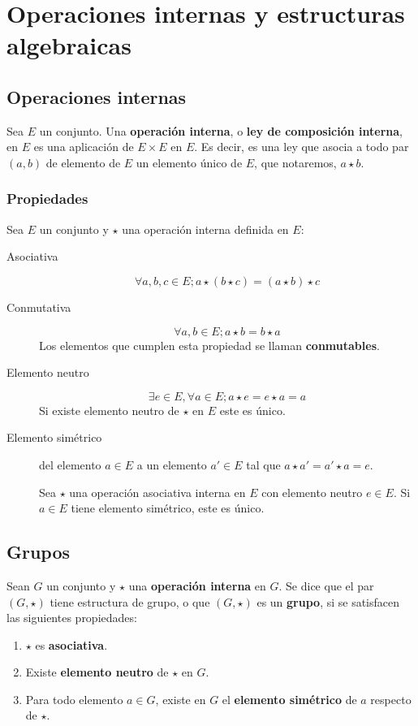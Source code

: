 \chapter{Operaciones internas y estructuras algebraicas}

\section{Operaciones internas}

Sea $E$ un conjunto. Una \textbf{operación interna}, o \textbf{ley de composición interna}, en $E$ es una aplicación de $E \times E$ en $E$. Es decir, es una ley que asocia a todo par $(a,b)$ de elemento de $E$ un elemento único de $E$, que notaremos, $a \star b$.

\subsection{Propiedades}

Sea $E$ un conjunto y $\star$ una operación interna definida en $E$:

\begin{description}
\item[Asociativa]
\[
\forall a,b,c \in E; a \star (b \star c) = (a \star b) \star c
\]
\item[Conmutativa] 
\[
\forall a,b \in E; a \star b = b \star a
\]
Los elementos que cumplen esta propiedad se llaman \textbf{conmutables}.
\item[Elemento neutro] 
\[
\exists e \in E,\forall a \in E; a \star e = e \star a = a
\]
Si existe elemento neutro de $\star$ en $E$ este es único.
\item[Elemento simétrico] del elemento $a \in E$ a un elemento $a' \in E$ tal que $a \star a' = a' \star a = e$.

Sea $\star$ una operación asociativa interna en $E$ con elemento neutro $e \in E$. Si $a \in E$ tiene elemento simétrico, este es único.
\end{description}

\section{Grupos}

Sean $G$ un conjunto y $\star$ una \textbf{operación interna} en $G$. Se dice que el par $(G,\star)$ tiene estructura de grupo, o que $(G,\star)$ es un \textbf{grupo}, si se satisfacen las siguientes propiedades:
\begin{enumerate}
\item $\star$ es \textbf{asociativa}.
\item Existe \textbf{elemento neutro} de $\star$ en $G$.
\item Para todo elemento $a \in G$, existe en $G$ el \textbf{elemento simétrico} de $a$ respecto de $\star$.
\end{enumerate}

